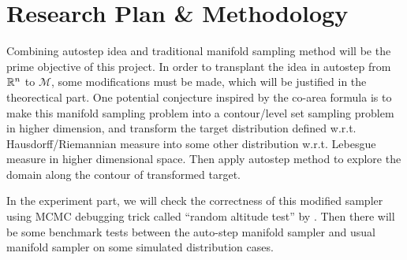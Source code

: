 \documentclass{article}
\begin{document}

\section{Research Plan \& Methodology}
Combining autostep idea and traditional manifold sampling method will be the prime objective of this project. In order to transplant the idea in autostep from $\mathbb R^n$ to $\mathscr{M}$, some modifications must be made, which will be justified in the theorectical part. One potential conjecture inspired by the co-area formula is to make this manifold sampling problem into a contour/level set sampling problem in higher dimension, and transform the target distribution defined w.r.t. Hausdorff/Riemannian measure into some other distribution w.r.t. Lebesgue measure in higher dimensional space. Then apply autostep method to explore the domain along the contour of transformed target.

In the experiment part, we will check the correctness of this modified sampler using MCMC debugging trick called ``random altitude test'' by \cite{ratest}. Then there will be some benchmark tests between the auto-step manifold sampler and usual manifold sampler on some simulated distribution cases. 



\nocite{*}



\clearpage

 
\end{document}
